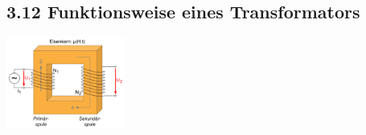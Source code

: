\subsection*{3.12 Funktionsweise eines Transformators}
    \centering
    \includegraphics[height = 30mm]{src/images/transformator.png}

